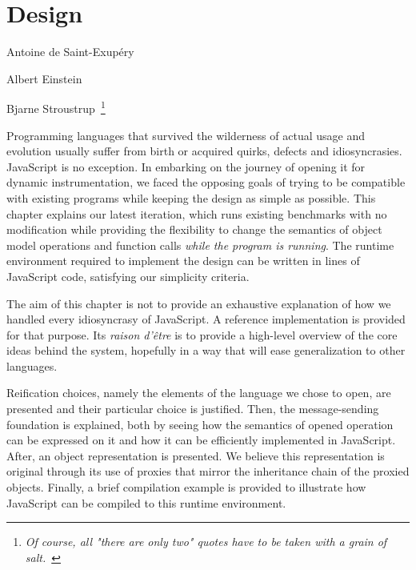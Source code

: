 \chapter{Design}
\label{chap:Design}
{Antoine de Saint-Exup\'ery}

{Albert Einstein}

{Bjarne Stroustrup~\footnote{\textit{Of course, all "there are only
two" quotes have to be taken with a grain of salt.}~\cite{stroustrup}}}

Programming languages that survived the wilderness of actual usage and
evolution usually suffer from birth or acquired quirks, defects and
idiosyncrasies. JavaScript is no exception. In embarking on the journey of
opening it for dynamic instrumentation, we faced the opposing goals of trying
to be compatible with existing programs while keeping the design as simple as
possible. This chapter explains our latest iteration, which runs existing
benchmarks with no modification while providing the flexibility to change the
semantics of object model operations and function calls \textit{while the
program is running}. The runtime environment required to implement the design
can be written in  lines
of JavaScript code, satisfying our simplicity criteria.

The aim of this chapter is not to provide an exhaustive explanation of how we
handled every idiosyncrasy of JavaScript. A reference implementation is
provided for that purpose. Its \textit{raison d'\^etre} is to provide a
high-level overview of the core ideas behind the system, hopefully in a way
that will ease generalization to other languages.

Reification choices, namely the elements of the language we chose to open, are
presented and their particular choice is justified. Then, the message-sending
foundation is explained, both by seeing how the semantics of opened operation
can be expressed on it and how it can be efficiently implemented in JavaScript.
After, an object representation is presented. We believe this representation is
original through its use of proxies that mirror the inheritance chain of the
proxied objects. Finally, a brief compilation example is provided to illustrate
how JavaScript can be compiled to this runtime environment.

